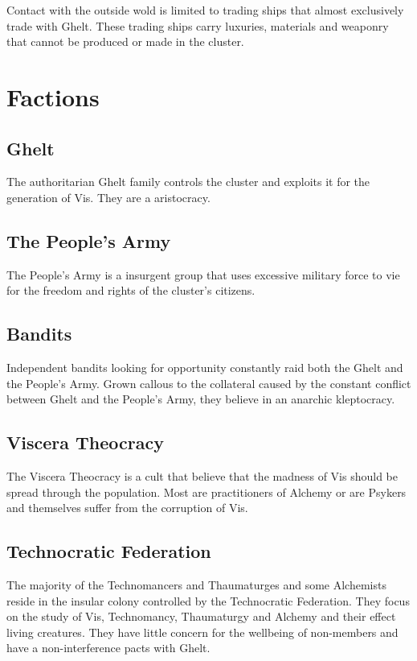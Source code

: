 \documentclass[a4paper,12pt,oneside]{book}
\begin{document}
        Contact with the outside wold is limited to trading ships that almost exclusively trade with Ghelt. These trading ships carry luxuries, materials and weaponry that cannot be produced or made in the cluster.
        
        \section{Factions}
            \subsection{Ghelt}
                The authoritarian Ghelt family controls the cluster and exploits it for the generation of Vis. They are a aristocracy.

            \subsection{The People's Army}
                The People's Army is a insurgent group that uses excessive military force to vie for the freedom and rights of the cluster's citizens.

            \subsection{Bandits}
                Independent bandits looking for opportunity constantly raid both the Ghelt and the People's Army. Grown callous to the collateral caused by the constant conflict between Ghelt and the People's Army, they believe in an anarchic kleptocracy.

            \subsection{Viscera Theocracy}
                The Viscera Theocracy is a cult that believe that the madness of Vis should be spread through the population. Most are practitioners of Alchemy or are Psykers and themselves suffer from the corruption of Vis.

            \subsection{Technocratic Federation}
                The majority of the Technomancers and Thaumaturges and some Alchemists reside in the insular colony controlled by the Technocratic Federation. They focus on the study of Vis, Technomancy, Thaumaturgy and Alchemy and their effect living creatures. They have little concern for the wellbeing of non-members and have a non-interference pacts with Ghelt.
            
\end{document}
